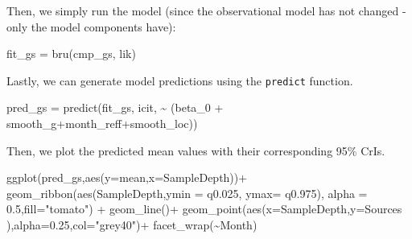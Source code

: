 \documentclass[
  letterpaper,
  DIV=11,
  numbers=noendperiod]{scrartcl}
\newenvironment{Shaded}{\begin{snugshade}}{\end{snugshade}}
\newcommand{\AttributeTok}[1]{\textcolor[rgb]{0.40,0.45,0.13}{#1}}
\newcommand{\FloatTok}[1]{\textcolor[rgb]{0.68,0.00,0.00}{#1}}
\newcommand{\FunctionTok}[1]{\textcolor[rgb]{0.28,0.35,0.67}{#1}}
\newcommand{\NormalTok}[1]{\textcolor[rgb]{0.00,0.23,0.31}{#1}}
\newcommand{\OtherTok}[1]{\textcolor[rgb]{0.00,0.23,0.31}{#1}}
\newcommand{\SpecialCharTok}[1]{\textcolor[rgb]{0.37,0.37,0.37}{#1}}
\newcommand{\StringTok}[1]{\textcolor[rgb]{0.13,0.47,0.30}{#1}}
\begin{document}
Then, we simply run the model (since the observational model has not
changed -only the model components have):

\begin{Shaded}
\begin{Highlighting}[]
\NormalTok{fit\_gs }\OtherTok{=} \FunctionTok{bru}\NormalTok{(cmp\_gs, lik) }
\end{Highlighting}
\end{Shaded}

Lastly, we can generate model predictions using the \texttt{predict}
function.

\begin{Shaded}
\begin{Highlighting}[]
\NormalTok{pred\_gs }\OtherTok{=} \FunctionTok{predict}\NormalTok{(fit\_gs, icit, }\SpecialCharTok{\textasciitilde{}}\NormalTok{ (beta\_0 }\SpecialCharTok{+}\NormalTok{ smooth\_g}\SpecialCharTok{+}\NormalTok{month\_reff}\SpecialCharTok{+}\NormalTok{smooth\_loc))}
\end{Highlighting}
\end{Shaded}

Then, we plot the predicted mean values with their corresponding 95\%
CrIs.

\begin{Shaded}
\begin{Highlighting}[]
\FunctionTok{ggplot}\NormalTok{(pred\_gs,}\FunctionTok{aes}\NormalTok{(}\AttributeTok{y=}\NormalTok{mean,}\AttributeTok{x=}\NormalTok{SampleDepth))}\SpecialCharTok{+}
  \FunctionTok{geom\_ribbon}\NormalTok{(}\FunctionTok{aes}\NormalTok{(SampleDepth,}\AttributeTok{ymin =}\NormalTok{ q0}\FloatTok{.025}\NormalTok{, }\AttributeTok{ymax=}\NormalTok{ q0}\FloatTok{.975}\NormalTok{), }\AttributeTok{alpha =} \FloatTok{0.5}\NormalTok{,}\AttributeTok{fill=}\StringTok{"tomato"}\NormalTok{) }\SpecialCharTok{+}
  \FunctionTok{geom\_line}\NormalTok{()}\SpecialCharTok{+}
  \FunctionTok{geom\_point}\NormalTok{(}\FunctionTok{aes}\NormalTok{(}\AttributeTok{x=}\NormalTok{SampleDepth,}\AttributeTok{y=}\NormalTok{Sources ),}\AttributeTok{alpha=}\FloatTok{0.25}\NormalTok{,}\AttributeTok{col=}\StringTok{"grey40"}\NormalTok{)}\SpecialCharTok{+}
  \FunctionTok{facet\_wrap}\NormalTok{(}\SpecialCharTok{\textasciitilde{}}\NormalTok{Month)}
\end{Highlighting}
\end{Shaded}
\end{document}
